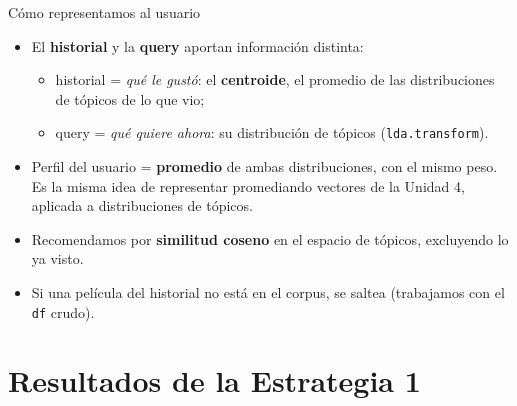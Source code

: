 \documentclass[10pt,aspectratio=169]{beamer}
\begin{document}
\begin{frame}{Cómo representamos al usuario}
  \begin{itemize}
    \item El \textbf{historial} y la \textbf{query} aportan información distinta:
      \begin{itemize}
        \item historial = \emph{qué le gustó}: el \textbf{centroide}, el promedio de las distribuciones de tópicos de lo que vio;
        \item query = \emph{qué quiere ahora}: su distribución de tópicos (\texttt{lda.transform}).
      \end{itemize}
    \item Perfil del usuario = \textbf{promedio} de ambas distribuciones, con el mismo peso. Es la misma idea de representar promediando vectores de la Unidad 4, aplicada a distribuciones de tópicos.
    \item Recomendamos por \textbf{similitud coseno} en el espacio de tópicos, excluyendo lo ya visto.
    \item Si una película del historial no está en el corpus, se saltea (trabajamos con el \texttt{df} crudo).
  \end{itemize}
\end{frame}

\section{Resultados de la Estrategia 1}
\end{document}
